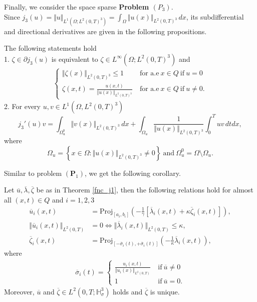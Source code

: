 \documentclass[reqno]{amsart}
\begin{document}
	Finally, we consider the space sparse \textbf{Problem $(P_3)$}.\\
	Since $\displaystyle j_3(u)=\Vert u\Vert_{L^1(\Omega;L^2(0,T)^3)}=\int_\Omega \Vert u(x) \Vert_{L^2(0,T)^3} \,dx$, its subdifferential and directional derivatives are given in the following propositions.
	\begin{proposition}
		The following statements hold \\
		1. $\zeta \in \partial j_3(u)$ is equivalent to $\zeta\in L^\infty(\Omega;L^2(0,T)^3)$ and
		\begin{equation} \label{j3_1}
			\displaystyle
			\begin{aligned}
				\begin{cases}
					\Vert \zeta(x) \Vert_{L^2(0,T)^3} \leq 1 &\ \text{for a.e} \ x\in Q \ \text{if} \ u=0\\
					\zeta(x,t) = \frac{u(x,t)}{\Vert u(x) \Vert_{L^2(0,T)^3}} &\ \text{for a.e} \ x\in Q \ \text{if} \ u\ne0.
				\end{cases}
			\end{aligned}
		\end{equation}
		2. For every $u,v \in L^1(\Omega,L^2(0,T)^3)$
		\begin{equation} \label{j3_2}
			j_3'(u)v= \int_{\Omega_u^0} \Vert v(x) \Vert _{L^2(0,T)^3} \, dx + \int_{\Omega_u} \frac{1}{\Vert u(x) \Vert_{L^2(0,T)^3}} \int_0^T uv \, dtdx,
		\end{equation}
		where
		\[\Omega_u=\left\{ x \in \Omega: \Vert u(x) \Vert_{L^2(0,T)^3} \neq 0 \right\} \ \text{and} \ \Omega_u^0 = \Omega \setminus \Omega_u.\]
	\end{proposition}
	Similar to problem $(\textbf{P}_1)$, we get the following corollary.
	\begin{corollary}
		Let $\overline{u}, \overline{\lambda}, \overline{\zeta}$ be as in Theorem \ref{fnc_j1}, then the following relations hold for almost all $(x,t)\in Q$ and $i=1,2,3$
		\begin{align}
			\overline{u}_i(x,t) &= \text{Proj}_{[a_i, b_i]} \left( -\frac{1}{\gamma} \left[ \overline{\lambda}_i(x,t) + \kappa \overline{\zeta}_i(x,t) \right] \right), \label{j3_3}\\
			\Vert \overline{u}_i(x,t) \Vert_{L^2(0,T)} &= 0 \Leftrightarrow \Vert \overline{\lambda}_i(x,t) \Vert_{L^2(0,T)} \leq \kappa, \label{j3_4}\\
			\overline{\zeta}_i(x,t) &= \text{Proj}_{[-\overline{\sigma}_i(t), +\overline{\sigma}_i(t)]} \left( -\frac{1}{\kappa} \overline{\lambda}_i(x,t) \right),\label{j3_5}
		\end{align}
		where
		\begin{align*}
			\overline{\sigma}_i(t)=\begin{cases}
				\frac{u_i(x,t)}{\Vert u_i(x) \Vert_{L^2(0,T)}} \ &\text{if} \ \overline{u}\neq 0 \\
				1 \ &\text{if} \ \overline{u} = 0.
			\end{cases}
		\end{align*}
		Moreover, $\overline{u}$ and $\overline{\zeta}\in L^2(0,T;\mathbb{H}^3_\sigma)$ holds and $\overline{\zeta}$ is unique. 
	\end{corollary}
	
\end{document}
